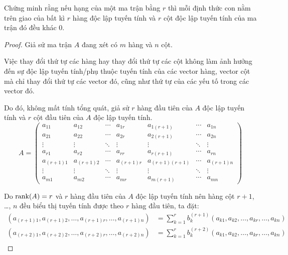 \documentclass[class=nhvh-linear-algebra,crop=false]{standalone}
\begin{document}
\begin{exercise}
    \par Chứng minh rằng nếu hạng của một ma trận bằng $r$ thì mỗi định thức con nằm trên giao của bất kì $r$ hàng độc lập tuyến tính và $r$ cột độc lập tuyến tính của ma trận đó đều khác 0.
\end{exercise}

\begin{proof}
    \par Giả sử ma trận $A$ đang xét có $m$ hàng và $n$ cột.
    \par Việc thay đổi thứ tự các hàng hay thay đổi thứ tự các cột không làm ảnh hưởng đến sự độc lập tuyến tính/phụ thuộc tuyến tính của các vector hàng, vector cột mà chỉ thay đổi thứ tự các vector đó, cũng như thứ tự của các yếu tố trong các vector đó.
    \par Do đó, không mất tính tổng quát, giả sử $r$ hàng đầu tiên của $A$ độc lập tuyến tính và $r$ cột đầu tiên của $A$ độc lập tuyến tính.
    \[
        A =
        \begin{pmatrix}
            a_{11}     & a_{12}     & \cdots & a_{1r}     & a_{1(r+1)}     & \cdots & a_{1n}     \\
            a_{21}     & a_{22}     & \cdots & a_{2r}     & a_{2(r+1)}     & \cdots & a_{2n}     \\
            \vdots     & \vdots     & \ddots & \vdots     & \vdots         & \ddots & \vdots     \\
            a_{r1}     & a_{r2}     & \cdots & a_{rr}     & a_{r(r+1)}     & \cdots & a_{rn}     \\
            a_{(r+1)1} & a_{(r+1)2} & \cdots & a_{(r+1)r} & a_{(r+1)(r+1)} & \cdots & a_{(r+1)n} \\
            \vdots     & \vdots     & \ddots & \vdots     & \vdots         & \ddots & \vdots     \\
            a_{m1}     & a_{m2}     & \cdots & a_{mr}     & a_{m(r+1)}     & \cdots & a_{mn}
        \end{pmatrix}
    \]
    \par Do $\text{rank}(A) = r$ và $r$ hàng đầu tiên của $A$ độc lập tuyến tính nên hàng cột $r+1$, \ldots, $n$ đều biểu thị tuyến tính được theo $r$ hàng đầu tiên, ta đặt:
    \begin{align*}
        (a_{(r+1)1}, a_{(r+1)2}, \ldots, a_{(r+1)r}, \ldots, a_{(r+1)n}) & = \sum^{r}_{k=1}b_{k}^{(r+1)}(a_{k1}, a_{k2}, \ldots, a_{kr}, \ldots, a_{kn}) \\
        (a_{(r+2)1}, a_{(r+2)2}, \ldots, a_{(r+2)r}, \ldots, a_{(r+2)n}) & = \sum^{r}_{k=1}b_{k}^{(r+2)}(a_{k1}, a_{k2}, \ldots, a_{kr}, \ldots, a_{kn}) \\

\end{align*}
\end{proof}
\end{document}
